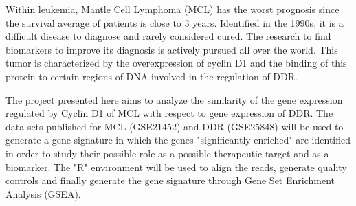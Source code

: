 Within leukemia, Mantle Cell Lymphoma (MCL) has the worst prognosis since the survival average of patients is close to 3 years. Identified in the 1990s, it is a difficult disease to diagnose and rarely considered cured. The research to find biomarkers to improve its diagnosis is actively pursued all over the world. This tumor is characterized by the overexpression of cyclin D1 and the binding of this protein to certain regions of DNA involved in the regulation of DDR.

The project presented here aims to analyze the similarity of the gene expression regulated by Cyclin D1 of MCL with respect to gene expression of DDR. The data sets published for MCL (GSE21452) and DDR (GSE25848) will be used to generate a gene signature in which the genes "significantly enriched" are identified in order to study their possible role as a possible therapeutic target and as a biomarker. The "R" environment will be used to align the reads, generate quality controls and finally generate the gene signature through Gene Set Enrichment Analysis (GSEA).
